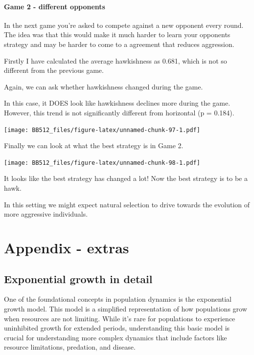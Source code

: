 \documentclass[
  a4paper]{book}
\begin{document}
\hypertarget{game-2---different-opponents}{%
\subsection{Game 2 - different opponents}\label{game-2---different-opponents}}

In the next game you're asked to compete against a new opponent every round. The idea was that this would make it much harder to learn your opponents strategy and may be harder to come to a agreement that reduces aggression.

Firstly I have calculated the average hawkishness as 0.681, which is not so different from the previous game.

Again, we can ask whether hawkishness changed during the game.

In this case, it DOES look like hawkishness declines more during the game. However, this trend is not significantly different from horizontal (p = 0.184).

\texttt{[image: BB512\_files/figure-latex/unnamed-chunk-97-1.pdf]}

Finally we can look at what the best strategy is in Game 2.

\texttt{[image: BB512\_files/figure-latex/unnamed-chunk-98-1.pdf]}

It looks like the best strategy has changed a lot! Now the best strategy is to be a hawk.

In this setting we might expect natural selection to drive towards the evolution of more aggressive individuals.

\hypertarget{part-appendix---extras}{%
\part{Appendix - extras}\label{part-appendix---extras}}

\hypertarget{exponential-growth-in-detail}{%
\chapter{Exponential growth in detail}\label{exponential-growth-in-detail}}

One of the foundational concepts in population dynamics is the exponential growth model. This model is a simplified representation of how populations grow when resources are not limiting. While it's rare for populations to experience uninhibited growth for extended periods, understanding this basic model is crucial for understanding more complex dynamics that include factors like resource limitations, predation, and disease.
\end{document}
